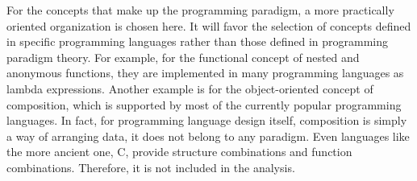 For the concepts that make up the programming paradigm, a more practically oriented organization is chosen here. It will favor the selection of concepts defined in specific programming languages rather than those defined in programming paradigm theory. For example, for the functional concept of nested and anonymous functions, they are implemented in many programming languages as lambda expressions. Another example is for the object-oriented concept of composition, which is supported by most of the currently popular programming languages. In fact, for programming language design itself, composition is simply a way of arranging data, it does not belong to any paradigm. Even languages like the more ancient one, C, provide structure combinations and function combinations. Therefore, it is not included in the analysis.

